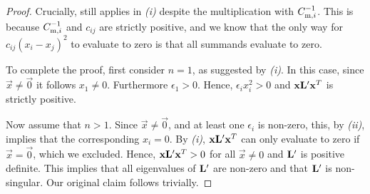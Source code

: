 \begin{proof}
Crucially,  still applies in \emph{(i)} despite the multiplication with ${C_{\mathrm{m}, i}^{-1}}$.
This is because ${C_{\mathrm{m}, i}^{-1}}$ and $c_{ij}$ are strictly positive, and we know that the only way for $c_{ij} (x_i - x_j)^2$ to evaluate to zero is that all summands evaluate to zero.

To complete the proof, first consider $n = 1$, as suggested by \emph{(i)}.
In this case, since $\vec x \neq \vec{0}$ it follows $x_1 \neq 0$. Furthermore $\epsilon_1 > 0$.
Hence, $\epsilon_i x_i^2 > 0$ and $\mathbf{x} \mathbf{L}' \mathbf{x}^T$ is strictly positive.

Now assume that $n > 1$. Since $\vec x \neq \vec{0}$, and at least one $\epsilon_i$ is non-zero, this, by \emph{(ii)}, implies that the corresponding $x_i = 0$.
By \emph{(i)}, $\mathbf{x} \mathbf{L}' \mathbf{x}^T$ can only evaluate to zero if $\vec x = \vec{0}$, which we excluded.
Hence, $\mathbf{x} \mathbf{L}' \mathbf{x}^T > 0$ for all $\vec x \neq 0$ and $\mathbf{L}'$ is positive definite.
This implies that all eigenvalues of $\mathbf{L}'$ are non-zero and that $\mathbf{L}'$ is non-singular.
Our original claim follows trivially.
\end{proof}

%
%
%

